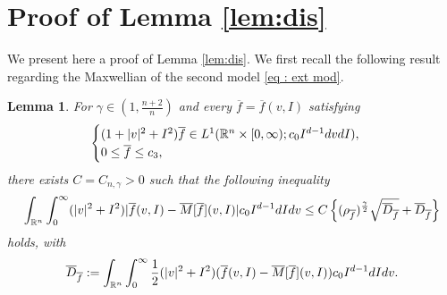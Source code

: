 \documentclass{amsart}
\theoremstyle{plain}
\newtheorem{lemma}[theorem]{Lemma}
\theoremstyle{remark}
\numberwithin{equation}{section}
\newcommand{\R}{\mathbb{R}}
\newcommand{\dv}{\textnormal{d}v}
\newcommand{\di}{\textnormal{d}I}
\newcommand{\ov}{\overline}
\begin{document}
\section{Proof of Lemma \ref{lem:dis}} \label{sec : proof of lem dis}
We present here a proof of Lemma \ref{lem:dis}. We first recall the following result regarding the Maxwellian of the second model \eqref{eq : ext mod}.
\begin{lemma}\cite[Proposition 4.6]{berthelinvasseur2005}
\label{lem b3} For $\gamma\in\left(1,\frac{n+2}{n}\right)$ and every $\ov{f} = \ov{f}(v,I)$ satisfying
\begin{align*}
\begin{cases}
(1+|v|^2+I^2)\ov{f}\in L^1(\R^n\times[0,\infty);c_0 I^{d-1} \dv \di),\\
0 \le \ov{f} \le c_3,
\end{cases}
\end{align*}
there exists $C=C_{n,\gamma}>0$ such that the following inequality
\begin{equation*}
    \int_{\R^n} \int_0^\infty (|v|^2+I^2) |\overline{f}(v,I) - \overline{M}[\ov{f}](v,I)| c_0 I^{d-1}\di\dv \le C\left\{(\rho_{\overline{f}})^{\frac{\gamma}{2}} \sqrt{\ov{D}_{\ov f}} + \ov{D}_{\ov f} \right\}
\end{equation*}
holds, with 
\[
    \ov{D}_{\ov f} := \displaystyle\int_{\R^n} \int_0^\infty \frac{1}{2}(|v|^2+I^2)(\overline{f}(v,I) - \overline{M}[\ov{f}](v,I)) c_0 I^{d-1} \textnormal{d}I \dv.
\]
\end{lemma}
\end{document}
